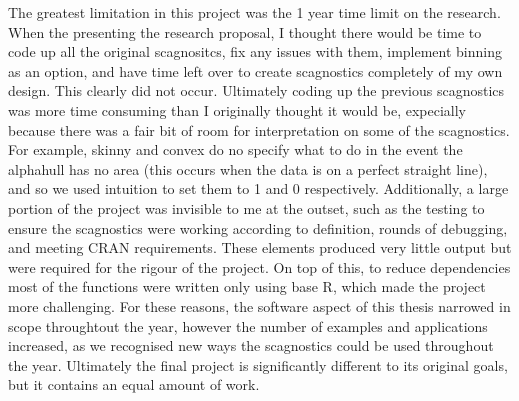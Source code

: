 The greatest limitation in this project was the 1 year time limit on the
research. When the presenting the research proposal, I thought there
would be time to code up all the original scagnositcs, fix any issues
with them, implement binning as an option, and have time left over to
create scagnostics completely of my own design. This clearly did not
occur. Ultimately coding up the previous scagnostics was more time
consuming than I originally thought it would be, expecially because
there was a fair bit of room for interpretation on some of the
scagnostics. For example, skinny and convex do no specify what to do in
the event the alphahull has no area (this occurs when the data is on a
perfect straight line), and so we used intuition to set them to 1 and 0
respectively. Additionally, a large portion of the project was invisible
to me at the outset, such as the testing to ensure the scagnostics were
working according to definition, rounds of debugging, and meeting CRAN
requirements. These elements produced very little output but were
required for the rigour of the project. On top of this, to reduce
dependencies most of the functions were written only using base R, which
made the project more challenging. For these reasons, the software
aspect of this thesis narrowed in scope throughtout the year, however
the number of examples and applications increased, as we recognised new
ways the scagnostics could be used throughout the year. Ultimately the
final project is significantly different to its original goals, but it
contains an equal amount of work.

